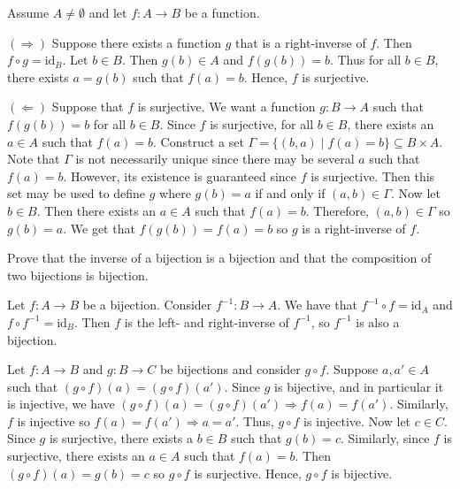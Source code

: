 \documentclass[../../master.tex]{subfiles}
\begin{document}
  \begin{solution}
    Assume \(A \neq \emptyset\) and let \(f: A \to B\) be a function.

    \(( \Longrightarrow)\) Suppose there exists a function \(g\) that is a right-inverse of \(f\). Then \(f \circ g = \text{id}_{B}\).
    Let \(b \in B\). Then \(g(b) \in A\) and \(f(g(b)) = b\). Thus for all \(b \in B\), there exists \(a = g(b)\) such that \(f(a) = b\). Hence, \(f\) is surjective.

    \(( \Longleftarrow)\) Suppose that \(f\) is surjective. We want a function \(g: B \to A\) such that \(f(g(b)) = b\) for all \(b \in B\).
    Since \(f\) is surjective, for all \(b \in B\), there exists an \(a \in A\) such that \(f(a) = b\).
    Construct a set \(\Gamma = \{(b, a) \mid f(a) = b\} \subseteq B \times A\).
    Note that \(\Gamma\) is not necessarily unique since there may be several \(a\) such that \(f(a) = b\).
    However, its existence is guaranteed since \(f\) is surjective.
    Then this set may be used to define \(g\) where \(g(b) = a\) if and only if \((a, b) \in \Gamma\).
    Now let \(b \in B\). Then there exists an \(a \in A\) such that \(f(a) = b\). Therefore, \((a, b) \in \Gamma\) so \(g(b) = a\).
    We get that \(f(g(b)) = f(a) = b\) so \(g\) is a right-inverse of \(f\).
  \end{solution}

  \begin{problem}
    Prove that the inverse of a bijection is a bijection and that the composition of two bijections is bijection.
  \end{problem}

  \begin{solution}
    Let \(f: A \to B\) be a bijection. Consider \(f^{-1}: B \to A\). We have that \(f^{-1} \circ f = \text{id}_{A}\) and \(f \circ f^{-1} = \text{id}_{B}\).
    Then \(f\) is the left- and right-inverse of \(f^{-1}\), so \(f^{-1}\) is also a bijection.

    Let \(f: A \to B\) and \(g: B \to C\) be bijections and consider \(g \circ f\). Suppose \(a, a' \in A\) such that \((g \circ f)(a) = (g \circ f)(a')\).
    Since \(g\) is bijective, and in particular it is injective, we have \((g \circ f)(a) = (g \circ f)(a') \Longrightarrow f(a) = f(a')\).
    Similarly, \(f\) is injective so \(f(a) = f(a') \Longrightarrow a = a'\). Thus, \(g \circ f\) is injective.
    Now let \(c \in C\). Since \(g\) is surjective, there exists a \(b \in B\) such that \(g(b) = c\).
    Similarly, since \(f\) is surjective, there exists an \(a \in A\) such that \(f(a) = b\).
    Then \((g \circ f)(a) = g(b) = c\) so \(g \circ f\) is surjective. Hence, \(g \circ f\) is bijective.
  \end{solution}
\end{document}
